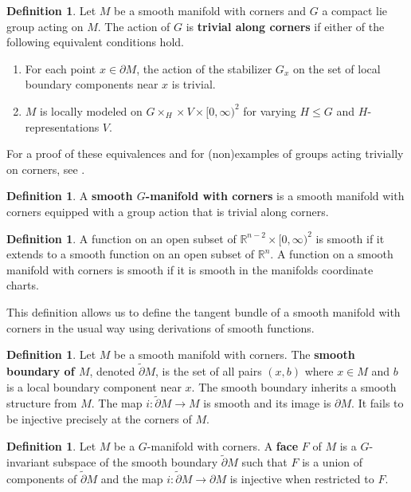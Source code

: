 \documentclass[11pt]{amsart}
\newcommand{\R}{\mathbb R}
\theoremstyle{plain}   %
\theoremstyle{definition}
\newtheorem{df}[thm]{Definition}
\theoremstyle{remark}
\numberwithin{equation}{section}
\begin{document}
\begin{df}
Let $M$ be a smooth manifold with corners and $G$ a compact lie group acting on $M$. The action of $G$ is \textbf{trivial along corners} if either of the following equivalent conditions hold. 
\begin{enumerate}
\item For each point $x\in \partial M$, the action of the stabilizer $G_x$ on the set of local boundary components near $x$ is trivial. 
\item $M$ is locally modeled on $G\times_H\times V\times [0,\infty)^2$ for varying $H\leq G$ and $H$-representations $V$. 
\end{enumerate}
\end{df}
For a proof of these equivalences and for (non)examples of groups acting trivially on corners, see \cite[2.6]{gimm}.

\begin{df}\label{df:G-manifold with corners}
A \textbf{smooth $G$-manifold with corners} is a smooth manifold with corners equipped with a group action that is trivial along corners.
\end{df}

\begin{df}
A function on an open subset of $\R^{n-2}\times[0,\infty)^2$ is smooth if it extends to a smooth function on an open subset of $\R^n$. A function on a smooth manifold with corners is smooth if it is smooth in the manifolds coordinate charts. 
\end{df}

This definition allows us to define the tangent bundle of a smooth manifold with corners in the usual way using derivations of smooth functions.

\begin{df}
Let $M$ be a smooth manifold with corners. The \textbf{smooth boundary of $M$}, denoted $\tilde{\partial}M$, is the set of all pairs $(x,b)$ where $x\in M$ and $b$ is a local boundary component near $x$. The smooth boundary inherits a smooth structure from $M$. The map $i:\tilde{\partial}M\to M$ is smooth and its image is $\partial M$. It fails to be injective precisely at the corners of $M$.
\end{df}

\begin{df}\label{df:face}
Let $M$ be a $G$-manifold with corners. A \textbf{face} $F$ of $M$ is a $G$-invariant subspace of the smooth boundary $\tilde{\partial}M$ such that $F$ is a union of components of $\tilde{\partial} M$ and the map $i:\tilde{\partial}M\to \partial M$ is injective when restricted to $F$. 
\end{df}
\end{document}
